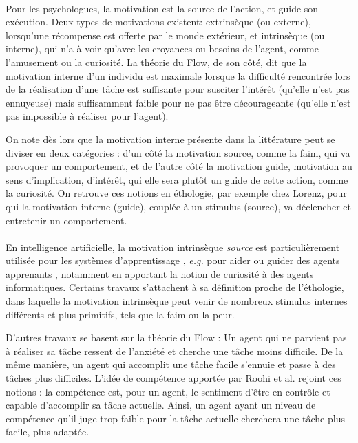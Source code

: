 \paragraph{}
Pour les psychologues, la motivation est la source de l'action, et guide son exécution. Deux types de motivations existent: extrinsèque (ou externe), lorsqu'une récompense est offerte par le monde extérieur, et intrinsèque (ou interne), qui n'a à voir qu'avec les croyances ou besoins de l'agent, comme l'amusement ou la curiosité. La théorie du Flow\cite{csikszentmihalyi_finding_1997}, de son côté, dit que la motivation interne d'un individu est maximale lorsque la difficulté rencontrée lors de la réalisation d'une tâche est suffisante pour susciter l'intérêt (qu'elle n'est pas ennuyeuse) mais suffisamment faible pour ne pas être décourageante (qu'elle n'est pas impossible à réaliser pour l'agent). 

On note dès lors que la motivation interne présente dans la littérature peut se diviser en deux catégories : d'un côté la motivation source, comme la faim, qui va provoquer un comportement, et de l'autre côté la motivation guide, motivation au sens d'implication, d'intérêt, qui elle sera plutôt un guide de cette action, comme la curiosité. On retrouve ces notions en éthologie, par exemple chez Lorenz\cite{lorenz_les_1984}, pour qui la motivation interne (guide), couplée à un stimulus (source), va déclencher et entretenir un comportement.
        
        
        \paragraph{}
        En intelligence artificielle, la motivation intrinsèque \textit{source} est particulièrement utilisée pour les systèmes d'apprentissage \cite{schmidhuber_formal_2010}, \textit{e.g.} pour aider ou guider des agents apprenants \cite{baldassarre_intrinsically_2013}, notamment en apportant la notion de curiosité à des agents informatiques. Certains travaux  \cite{carbonell_multi-agent_1994, maes_agent_1991} s'attachent à sa définition proche de l'éthologie, dans laquelle la motivation intrinsèque peut venir de nombreux stimulus internes différents et plus primitifs, tels que la faim ou la peur.
        
        D'autres travaux se basent sur la théorie du Flow : Un agent qui ne parvient pas à réaliser sa tâche ressent de l'anxiété et cherche une tâche moins difficile\cite{cornudella_how_2015}. De la même manière, un agent qui accomplit une tâche facile s'ennuie et passe à des tâches plus difficiles. L'idée de compétence apportée par Roohi et al.\cite{roohi_review_2018} rejoint ces notions : la compétence est, pour un agent, le sentiment d'être en contrôle et capable d'accomplir sa tâche actuelle. Ainsi, un agent ayant un niveau de compétence qu'il juge trop faible pour la tâche actuelle cherchera une tâche plus facile, plus adaptée.
        
